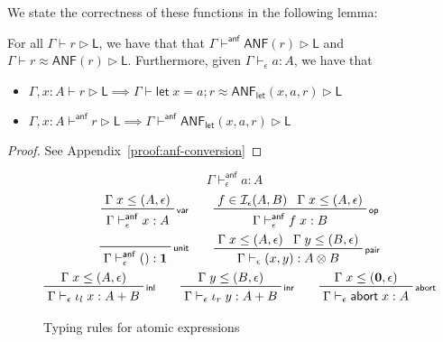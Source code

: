 \documentclass[acmsmall,screen,review]{acmart}
\newcommand{\mc}[1]{\ensuremath{\mathcal{#1}}}
\newcommand{\mb}[1]{\ensuremath{\mathbf{#1}}}
\newcommand{\ms}[1]{\ensuremath{\mathsf{#1}}}
\newcommand{\linl}[1]{\iota_l\;{#1}}
\newcommand{\linr}[1]{\iota_r\;{#1}}
\newcommand{\labort}[1]{\ms{abort}\;{#1}}
\newcommand{\letstmt}[3]{\ensuremath{\ms{let}\;#1 = #2; #3}}
\newcommand{\bhyp}[2]{#1 : #2}
\newcommand{\rle}[1]{{\scriptsize\textsf{#1}}}
\newcommand{\hasty}[4]{#1 \vdash_{#2} #3: {#4}}
\newcommand{\haslb}[3]{#1 \vdash #2 \rhd #3}
\newcommand{\ahasty}[4]{#1 \vdash_{#2}^{\ms{anf}} #3 : {#4}}
\newcommand{\ahaslb}[3]{#1 \vdash^{\ms{anf}} #2 \rhd #3}
\newcommand{\isop}[4]{#1 \in \mc{I}_{#4}(#2, #3)}
\newcommand{\teqv}{\approx}
\newcommand{\lbeq}[4]{#1 \vdash #2 \teqv #3 \rhd {#4}}
\newcommand{\letanf}[3]{\ms{ANF}_{\ms{let}}(#1, #2, #3)}
\begin{document}
We state the correctness of these functions in the following lemma:
\begin{lemma}[name=A-normalization, restate=anfconversion]
  For all $\haslb{\Gamma}{r}{\ms{L}}$, we have that that $\ahaslb{\Gamma}{\ms{ANF}(r)}{\ms{L}}$ and
  $\lbeq{\Gamma}{r}{\ms{ANF}(r)}{\ms{L}}$. Furthermore, given $\hasty{\Gamma}{\epsilon}{a}{A}$, we
  have that
  \begin{itemize}
    \item $\haslb{\Gamma, \bhyp{x}{A}}{r}{\ms{L}} \implies 
      \lbeq{\Gamma}{\letstmt{x}{a}{r}}{\letanf{x}{a}{r}}{\ms{L}}$
    \item $\ahaslb{\Gamma, \bhyp{x}{A}}{r}{\ms{L}} \implies
      \ahaslb{\Gamma}{\letanf{x}{a}{r}}{\ms{L}}$
  \end{itemize}
\end{lemma}
\begin{proof}
  See Appendix~\ref{proof:anf-conversion}
\end{proof}

\begin{figure}
  \begin{equation*}
    \boxed{\ahasty{\Gamma}{\epsilon}{a}{A}}
  \end{equation*}
  \begin{gather*}    
    \prftree[r]{\rle{var}}{\Gamma\;x \leq (A, \epsilon)}{\ahasty{\Gamma}{\epsilon}{x}{A}} \qquad
    \prftree[r]{\rle{op}}{\isop{f}{A}{B}{\epsilon}}{\Gamma\;x \leq (A, \epsilon)}
      {\ahasty{\Gamma}{\epsilon}{f\;x}{B}} \\
    \prftree[r]{\rle{unit}}{\ahasty{\Gamma}{\epsilon}{()}{\mb{1}}} \qquad
    \prftree[r]{\rle{pair}}{\Gamma\;x \leq (A, \epsilon)}{\Gamma\;y \leq (B, \epsilon)}
      {\hasty{\Gamma}{\epsilon}{(x, y)}{A \otimes B}} \\
    \prftree[r]{\rle{inl}}{\Gamma\;x \leq (A, \epsilon)}
      {\hasty{\Gamma}{\epsilon}{\linl{x}}{A + B}} \qquad
    \prftree[r]{\rle{inr}}{\Gamma\;y \leq (B, \epsilon)}
      {\hasty{\Gamma}{\epsilon}{\linr{y}}{A + B}} \qquad
    \prftree[r]{\rle{abort}}{\Gamma\;x \leq (\mb{0}, \epsilon)}
      {\hasty{\Gamma}{\epsilon}{\labort{x}}{A}}
  \end{gather*}
  \caption{Typing rules for atomic expressions}
  \Description{}
  \label{fig:ssa-ops}
\end{figure}
\end{document}
